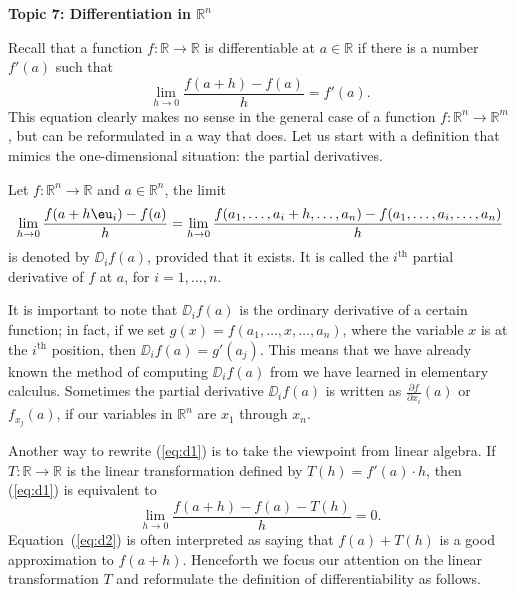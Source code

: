 \documentclass[11pt]{article}
\begin{document}
\begin{center}
  \textbf{Topic 7: Differentiation in $\mathbb{R}^n$} 
\end{center}

Recall that a function $f : \mathbb{R} \rightarrow \mathbb{R}$ is differentiable
at $a \in \mathbb{R}$ if there is a number $f'(a)$ such that
\begin{equation}
  \label{eq:d1}
  \lim_{h \rightarrow 0} \frac{f(a+h) - f(a)}{h} = f'(a).
\end{equation}
This equation clearly makes no sense in the general case of a function
$f : \mathbb{R}^n \rightarrow \mathbb{R}^m$, but can be reformulated in a way that
does.  
Let us start with a definition that mimics the one-dimensional situation: the partial derivatives.

\begin{defn}
  Let $f : \mathbb{R}^n \rightarrow \mathbb{R}$ and $a \in \mathbb{R}^n$, the limit
  \begin{equation}
    \label{defn:partial-derivative}
     \lim_{h \to 0} \frac{ f(a+h\eu_i) - f(a)}{h} = \lim_{h \rightarrow 0} \frac{ f( a_1, \dots, a_i + h, \dots, a_n) - f(a_1, \dots, a_i, \dots, a_n) }{ h }
  \end{equation}
  is denoted by $\DD_i f(a)$, provided that it exists.  
  It is called the $i^{\text{th}}$ \textsf{partial derivative} of $f$ at $a$, for $i = 1, \dots, n$.
\end{defn}

It is important to note that $\DD_i f(a)$ is the ordinary derivative of a certain function; in fact, if we set $g(x) = f(a_1, \dots, x, \dots, a_n)$, where the variable $x$ is at the $i^{\text{th}}$ position, then $\DD_i f(a) = g'(a_j)$.  
This means that we have already known the method of computing $\DD_i f(a)$ from we have learned in elementary calculus.
Sometimes the partial derivative $\DD_i f(a)$ is written as $\displaystyle
\frac{\partial f}{\partial x_i} (a)$ or $f_{x_j}(a)$, if our variables in $\mathbb{R}^n$ are $x_1$ through $x_n$.

Another way to rewrite (\ref{eq:d1}) is to take the viewpoint from linear algebra.
If $T : \mathbb{R} \rightarrow \mathbb{R}$ is the linear transformation defined by $T(h) = f'(a) \cdot h$, then (\ref{eq:d1}) is equivalent to
\begin{equation}
  \label{eq:d2}
  \lim_{h \rightarrow 0} \frac{ f(a+h) - f(a) - T(h) }{h} = 0.
\end{equation}
Equation~(\ref{eq:d2}) is often interpreted as saying that $f(a) + T(h)$ is a good approximation to $f(a+h)$.  
Henceforth we focus our attention on the linear transformation $T$ and reformulate the definition of differentiability as follows.
\end{document}
